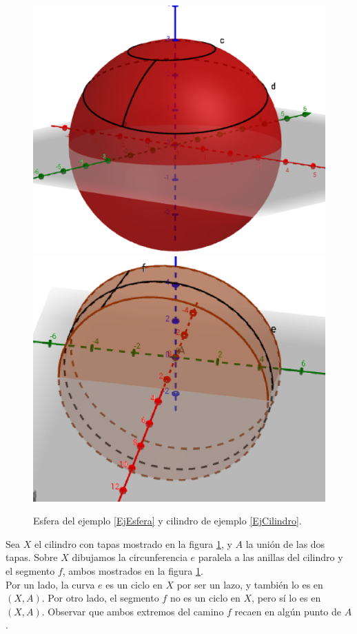 \begin{figure}[h]
\centering
\includegraphics[scale=0.35]{Figures/EsferaParDEspais.eps}
\includegraphics[scale=0.35]{Figures/CilParDEspais.eps}
\caption{\label{FigEsfera} Esfera del ejemplo \ref{EjEsfera} y cilindro de ejemplo \ref{EjCilindro}.}
\end{figure}

\begin{ejem}\label{EjCilindro}
Sea $X$ el cilindro con tapas mostrado en la figura \ref{FigEsfera}, y $A$ la unión de las dos tapas. Sobre $X$ dibujamos la circunferencia $e$ paralela a las anillas del cilindro y el segmento $f$, ambos mostrados en la figura \ref{FigEsfera}.
\\

Por un lado, la curva $e$ es un ciclo en $X$ por ser un lazo, y también lo es en $(X,A)$. Por otro lado, el segmento $f$ no es un ciclo en $X$, pero sí lo es en $(X,A)$. Observar que ambos extremos del camino $f$ recaen en algún punto de $A$.
\end{ejem}

